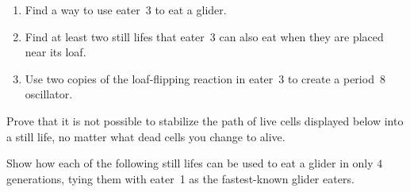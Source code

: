\begin{multicols}{2}
\begin{problem}
		\begin{enumerate}[label=\bf\color{ocre}(\alph*)]
			\item Find a way to use eater~3 to eat a glider.
			
			\item Find at least two still lifes that eater~3 can also eat when they are placed near its loaf.
			
			\item Use two copies of the loaf-flipping reaction in eater~3 to create a period~$8$ oscillator.
		\end{enumerate}
	\end{problem}
	
	
	\mfilbreak
	
	
	\begin{problem}\label{exer:still_life_impossible}
		Prove that it is not possible to stabilize the path of live cells displayed below into a still life, no matter what dead cells you change to alive.
		
		\begin{center}
		\end{center}
	\end{problem}
	
	
	\mfilbreak
	
	
	\begin{problemstar}\label{exer:fast_glider_eater}
		Show how each of the following still lifes can be used to eat a glider in only $4$ generations, tying them with eater~1 as the fastest-known glider eaters.\vspace*{-0.25cm}
		

\end{problemstar}
\end{multicols}
